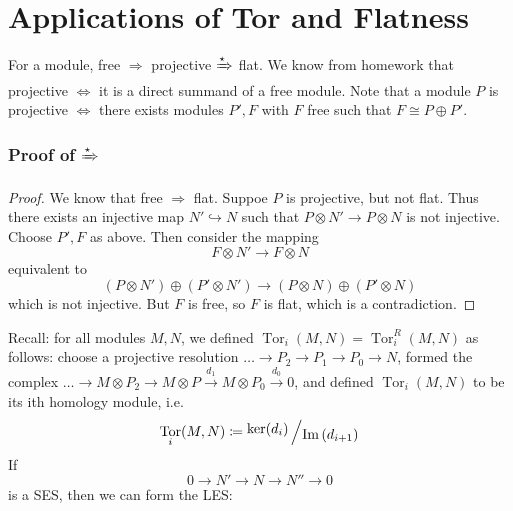 \documentclass[12pt]{article}
\DeclareMathOperator{\Im}{Im}
\DeclareMathOperator{\Tor}{Tor}
\newcommand{\bigslant}[2]{{\raisebox{.2em}{$#1$}\left/\raisebox{-.2em}{$#2$}\right.}}
\theoremstyle{definition}
\begin{document}
\section*{Applications of Tor and Flatness}
For a module, free $\Rightarrow$ projective $\xRightarrow{\star}$ flat. We know from homework that projective $\iff$ it is a direct summand of a free module. Note that a module $P$ is projective $\iff$ there exists modules $P', F$ with $F$ free such that $F \cong P \oplus P'$.
\subsubsection*{Proof of $\xRightarrow{\star}$}
\begin{proof}
We know that free $\Rightarrow$ flat. Suppoe $P$ is projective, but not flat. Thus there exists an injective map $N' \hookrightarrow N$ such that $P \otimes N' \rightarrow P \otimes N$ is not injective. Choose $P', F$ as above. Then consider the mapping
\[
F \otimes N' \rightarrow F \otimes N
\]
equivalent to
\[
(P \otimes N') \oplus (P' \otimes N') \rightarrow (P \otimes N)\oplus(P' \otimes N)
\]
which is not injective. But $F$ is free, so $F$ is flat, which is a contradiction.
\end{proof}
Recall: for all modules $M,N$, we defined $\Tor_i(M,N) = \Tor_i^R(M,N)$ as follows: choose a projective resolution $\dots \rightarrow P_2\rightarrow P_1 \rightarrow P_0 \rightarrow N$, formed the complex $\dots \rightarrow M \otimes P_2 \rightarrow M \otimes P \xrightarrow{d_1} M \otimes P_0 \xrightarrow{d_0} 0$, and defined $\Tor_i (M,N)$ to be its ith homology module, i.e.
\[
\Tor_i (M,N) \coloneqq \bigslant{\ker (d_i)}{\Im{(d_{i+1})}}
\]
If 
\[
0 \rightarrow N' \rightarrow N \rightarrow N'' \rightarrow 0
\]
is a SES, then we can form the LES:
\end{document}
